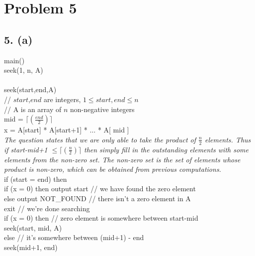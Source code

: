 \documentclass{article}[12pt]
\begin{document}
\section*{Problem 5}

\subsection*{5. (a)}
  main() \\
    \indent seek(1, n, A) \\ \\
  seek(start,end,A) \\
    \indent // $start$,$end$ are integers, $1 \leq start,end \leq n$ \\
    \indent // A is an array of $n$ non-negative integers \\
      \indent mid = $\lceil(\frac{end}{2})\rceil$ \\
      \indent x = A[start] * A[start+1] * $\ldots$ * A[ mid ] \\
      \indent \emph{The question states that we are only able to take the product of $\frac{n}{2}$ elements. Thus if start-mid+1 $\leq \lceil(\frac{n}{2})\rceil$ then simply fill in the outstanding elements with some elements from the \emph{non-zero} set. The non-zero set is the set of elements whose product is non-zero, which can be obtained from previous computations.} \\
      \indent if (start = end) then \\
        \indent \indent if (x = 0) then output start // we have found the zero element \\
        \indent \indent else output NOT\_FOUND // there isn't a zero element in A \\
        \indent \indent exit // we're done searching \\
      \indent if (x = 0) then // zero element is somewhere between start-mid \\
        \indent \indent seek(start, mid, A) \\
      \indent else // it's somewhere between (mid+1) - end \\
        \indent \indent seek(mid+1, end) \\
\end{document}
